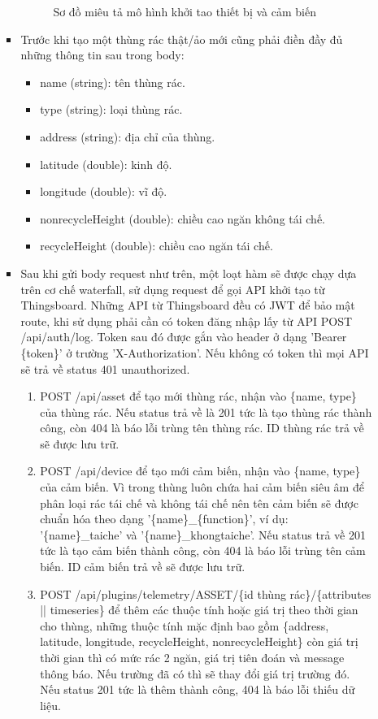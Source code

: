 \begin{itemize}
\begin{itemize}
\begin{itemize}
\begin{figure}[H]
                \caption{Sơ đồ miêu tả mô hình khởi tao thiết bị và cảm biến}
                \label{fig:create_device}
            \end{figure}
            \item Trước khi tạo một thùng rác thật/ảo mới cũng phải điền đầy đủ những thông tin sau trong body:
            \begin{itemize}
                \item name (string): tên thùng rác.
                \item type (string): loại thùng rác.
                \item address (string): địa chỉ của thùng.
                \item latitude (double): kinh độ.
                \item longitude (double): vĩ độ.
                \item nonrecycleHeight (double): chiều cao ngăn không tái chế.
                \item recycleHeight (double): chiều cao ngăn tái chế. 
            \end{itemize} 
            \item Sau khi gửi body request như trên, một loạt hàm sẽ được chạy dựa trên cơ chế waterfall, sử dụng request để gọi API khởi tạo từ Thingsboard. Những API từ Thingsboard đều có JWT để bảo mật route, khi sử dụng phải cần có token đăng nhập lấy từ API POST /api/auth/log. Token sau đó được gắn vào header ở dạng 'Bearer \{token\}' ở trường 'X-Authorization'. Nếu không có token thì mọi API sẽ trả về status 401 unauthorized.
            \begin{enumerate}
                \item POST /api/asset để tạo mới thùng rác, nhận vào \{name, type\} của thùng rác. Nếu status trả về là 201 tức là tạo thùng rác thành công, còn 404 là báo lỗi trùng tên thùng rác. ID thùng rác trả về sẽ được lưu trữ.
                \item POST /api/device để tạo mới cảm biến, nhận vào \{name, type\} của cảm biến. Vì trong thùng luôn chứa hai cảm biến siêu âm để phân loại rác tái chế và không tái chế nên tên cảm biến sẽ được chuẩn hóa theo dạng '\{name\}{\_}\{function\}', ví dụ: '\{name\}{\_}taiche' và '\{name\}{\_}khongtaiche'. Nếu status trả về 201 tức là tạo cảm biến thành công, còn 404 là báo lỗi trùng tên cảm biến. ID cảm biến trả về sẽ được lưu trữ.
                \item POST /api/plugins/telemetry/ASSET/\{id thùng rác\}/\{attributes || timeseries\} để thêm các thuộc tính hoặc giá trị theo thời gian cho thùng, những thuộc tính mặc định bao gồm \{address, latitude, longitude, recycleHeight, nonrecycleHeight\} còn giá trị thời gian thì có mức rác 2 ngăn, giá trị tiên đoán và message thông báo. Nếu trường đã có thì sẽ thay đổi giá trị trường đó. Nếu status 201 tức là thêm thành công, 404 là báo lỗi thiếu dữ liệu.

\end{enumerate}
\end{itemize}
\end{itemize}
\end{itemize}
